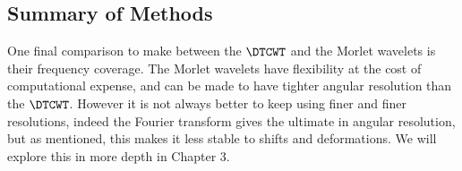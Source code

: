 
  \begin{figure}
    \label{fig:ch2:dtcwt_lwoodpaley}
  \end{figure}

\subsection{Summary of Methods}
  One final comparison to make between the $\DTCWT$ and the Morlet wavelets is
  their frequency coverage. The Morlet wavelets have flexibility at the cost of 
  computational expense, and can be made to have tighter angular resolution than
  the $\DTCWT$. However it is not always
  better to keep using finer and finer resolutions, indeed the Fourier
  transform gives the ultimate in angular resolution, but as mentioned, this
  makes it less stable to shifts and deformations. We will explore this in more
  depth in Chapter 3.


